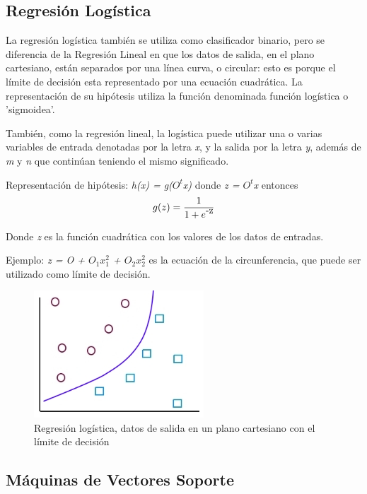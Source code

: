 \documentclass[a4paper,12pt,oneside,spanish]{book}
\begin{document}
\subsection{Regresión Logística}

La regresión logística también se utiliza como clasificador binario, pero se diferencia de la Regresión Lineal en que los datos de salida, en el plano cartesiano, están separados por una línea curva, o circular: esto es porque el límite de decisión esta representado por una ecuación cuadrática. La representación de su hipótesis utiliza la función denominada función logística o 'sigmoidea'. \par

También, como la regresión lineal, la logística puede utilizar una o varias variables de entrada denotadas por la letra \textit{x}, y la salida por la letra \textit{y}, además de \textit{m} y \textit{n} que continúan teniendo el mismo significado. \par

Representación de hipótesis: \textit{h(x) = g($O^t$x)}
donde \textit{z = $O^t$x}
entonces 
\begin{equation}
	g(z) = \frac{1}{1 + e\raisebox{1ex}{-z}} 
\end{equation}

Donde \textit{z} es la función cuadrática con los valores de los datos de entradas. \par

Ejemplo: \textit{z = O + $O_1$$x^2_1$ + $O_2$$x^2_2$}  es la ecuación de la circunferencia, que puede ser utilizado como límite de decisión.

\begin{figure}[h!]
	\includegraphics[width=180pt]{Imagenes/regresion2.jpg}
	\centering
	\caption{Regresión logística, datos de salida en un plano cartesiano con el límite de decisión}
	\label{fig:regresion2}
\end{figure}

\subsection{Máquinas de Vectores Soporte}
\end{document}
